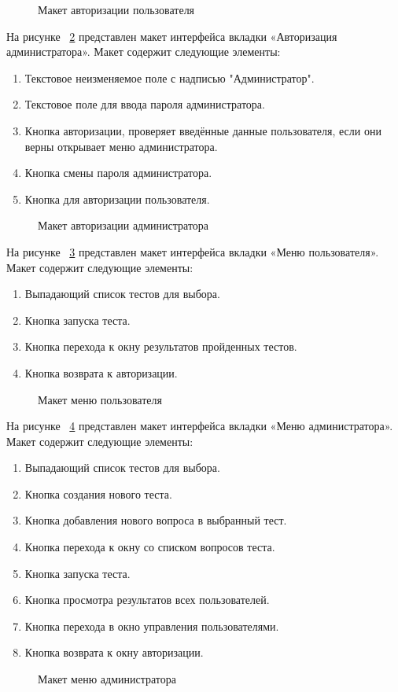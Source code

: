 \begin{figure}[H]
	\caption{Макет авторизации пользователя}
	\label{user_auth:image}
\end{figure}

На рисунке ~\ref{admin_auth:image} представлен макет интерфейса вкладки «Авторизация администратора». Макет содержит следующие элементы:
\begin{enumerate}
	\item Текстовое неизменяемое поле с надписью "Администратор".
	\item Текстовое поле для ввода пароля администратора.
	\item Кнопка авторизации, проверяет введённые данные пользователя, если они верны открывает меню администратора.
	\item Кнопка смены пароля администратора.
	\item Кнопка для авторизации пользователя. 
\end{enumerate}

\begin{figure}[H]
	\caption{Макет авторизации администратора}
	\label{admin_auth:image}
\end{figure}

На рисунке ~\ref{user_menu:image} представлен макет интерфейса вкладки «Меню пользователя». Макет содержит следующие элементы:
\begin{enumerate}
	\item Выпадающий список тестов для выбора.
	\item Кнопка запуска теста.
	\item Кнопка перехода к окну результатов пройденных тестов.
	\item Кнопка возврата к авторизации.
\end{enumerate}

\begin{figure}[H]
	\caption{Макет меню пользователя}
	\label{user_menu:image}
\end{figure}

На рисунке ~\ref{admin_menu:image} представлен макет интерфейса вкладки «Меню администратора». Макет содержит следующие элементы:
\begin{enumerate}
	\item Выпадающий список тестов для выбора.
	\item Кнопка создания нового теста.
	\item Кнопка добавления нового вопроса в выбранный тест.
	\item Кнопка перехода к окну со списком вопросов теста.
	\item Кнопка запуска теста.
	\item Кнопка просмотра результатов всех пользователей.
	\item Кнопка перехода в окно управления пользователями.
	\item Кнопка возврата к окну авторизации.
\end{enumerate}

\begin{figure}[H]
	\caption{Макет меню администратора}
	\label{admin_menu:image}
\end{figure}
